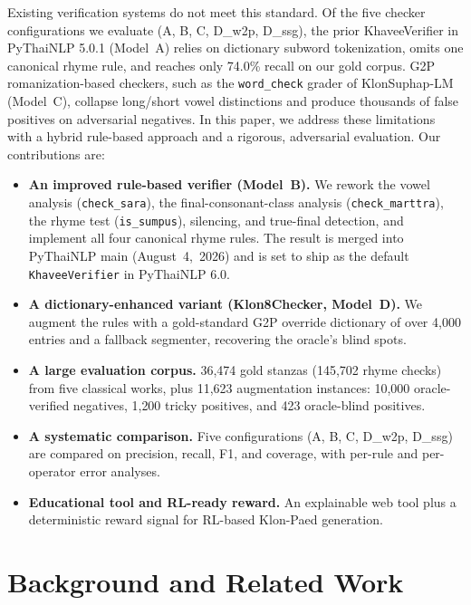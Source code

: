 \documentclass[conference]{IEEEtran}
\begin{document}
Existing verification systems do not meet this standard. 
Of the five checker configurations we evaluate (A, B, C, D\_w2p, D\_ssg),
the prior KhaveeVerifier in PyThaiNLP 5.0.1 (Model~A) relies on dictionary
subword tokenization, omits one canonical rhyme rule, and reaches only
74.0\% recall on our gold corpus. G2P romanization-based checkers, such as the
\texttt{word\_check} grader of KlonSuphap-LM~\cite{klonsuphap} (Model~C),
collapse long/short vowel distinctions and produce thousands of false
positives on adversarial negatives. In this paper, we
address these limitations with a hybrid rule-based approach and a
rigorous, adversarial evaluation. Our contributions are:

\begin{itemize}
\item \textbf{An improved rule-based verifier (Model~B).} We rework the
vowel analysis (\texttt{check\_sara}), the final-consonant-class analysis
(\texttt{check\_marttra}), the rhyme test (\texttt{is\_sumpus}), 
silencing, and true-final detection, and implement all four canonical rhyme rules.
The result is merged into PyThaiNLP main (August~4,~2026) and is set to
ship as the default \texttt{KhaveeVerifier} in PyThaiNLP 6.0.
\item \textbf{A dictionary-enhanced variant (Klon8Checker, Model~D).} We augment
the rules with a gold-standard G2P override dictionary of over 4{,}000
entries and a fallback segmenter, recovering the oracle's blind spots.
\item \textbf{A large evaluation corpus.} 36{,}474 gold stanzas (145{,}702
rhyme checks) from five classical works, plus 11{,}623 augmentation
instances: 10{,}000 oracle-verified negatives, 1{,}200 tricky positives,
and 423 oracle-blind positives.
\item \textbf{A systematic comparison.} Five configurations (A, B, C,
D\_w2p, D\_ssg) are compared on precision, recall, F1, and coverage, with
per-rule and per-operator error analyses.
\item \textbf{Educational tool and RL-ready reward.} An explainable web
tool plus a deterministic reward signal for RL-based Klon-Paed generation.
\end{itemize}


\section{Background and Related Work}
\label{sec:bg}
\end{document}
